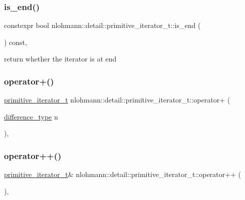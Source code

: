 \subsubsection{\texorpdfstring{is\_end()}{is\_end()}}
{\footnotesize\ttfamily constexpr bool nlohmann\+::detail\+::primitive\+\_\+iterator\+\_\+t\+::is\+\_\+end (\begin{DoxyParamCaption}{ }\end{DoxyParamCaption}) const\hspace{0.3cm}{\ttfamily [inline]}, {\ttfamily [noexcept]}}



return whether the iterator is at end 

\mbox{\label{classnlohmann_1_1detail_1_1primitive__iterator__t_a00ce828d0fe58046c10e0445504df7bf}} 
\subsubsection{\texorpdfstring{operator+()}{operator+()}}
{\footnotesize\ttfamily \mbox{\hyperlink{classnlohmann_1_1detail_1_1primitive__iterator__t}{primitive\+\_\+iterator\+\_\+t}} nlohmann\+::detail\+::primitive\+\_\+iterator\+\_\+t\+::operator+ (\begin{DoxyParamCaption}\item[{\mbox{\hyperlink{classnlohmann_1_1detail_1_1primitive__iterator__t_af3db0d5c90de427d51645fe73a015553}{difference\+\_\+type}}}]{n }\end{DoxyParamCaption})\hspace{0.3cm}{\ttfamily [inline]}, {\ttfamily [noexcept]}}

\mbox{\label{classnlohmann_1_1detail_1_1primitive__iterator__t_ad26511012fc88f3ec5d9e1cb708732fd}} 
\subsubsection{\texorpdfstring{operator++()}{operator++()}\hspace{0.1cm}{\footnotesize\ttfamily [1/2]}}
{\footnotesize\ttfamily \mbox{\hyperlink{classnlohmann_1_1detail_1_1primitive__iterator__t}{primitive\+\_\+iterator\+\_\+t}}\& nlohmann\+::detail\+::primitive\+\_\+iterator\+\_\+t\+::operator++ (\begin{DoxyParamCaption}{ }\end{DoxyParamCaption})\hspace{0.3cm}{\ttfamily [inline]}, {\ttfamily [noexcept]}}

